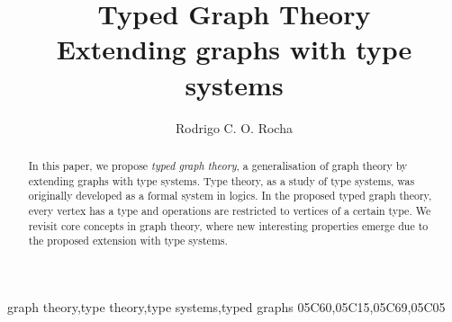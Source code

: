 \documentclass[preprint,12pt]{elsarticle}
\theoremstyle{plain}
\begin{document}
\begin{frontmatter}


\title{Typed Graph Theory\\Extending graphs with type systems}





\author{Rodrigo C. O. Rocha}
\address{School of Informatics\\University of Edinburgh\\Scotland, UK\\r.rocha@ed.ac.uk}




\begin{abstract}
In this paper, we propose \textit{typed graph theory},
a generalisation of graph theory by extending
graphs with type systems.
Type theory, as a study of type systems,
was originally developed as a formal system in logics.
In the proposed typed graph theory, every vertex has a type
and operations are restricted to vertices of a certain type.
We revisit core concepts in graph theory, where
new interesting properties emerge due to the proposed
extension with type systems.
\end{abstract}

\begin{keyword}
graph theory\sep type theory\sep type systems\sep typed graphs
\MSC[2010] 05C60\sep 05C15\sep 05C69\sep 05C05
\end{keyword}

\end{frontmatter}
\end{document}

